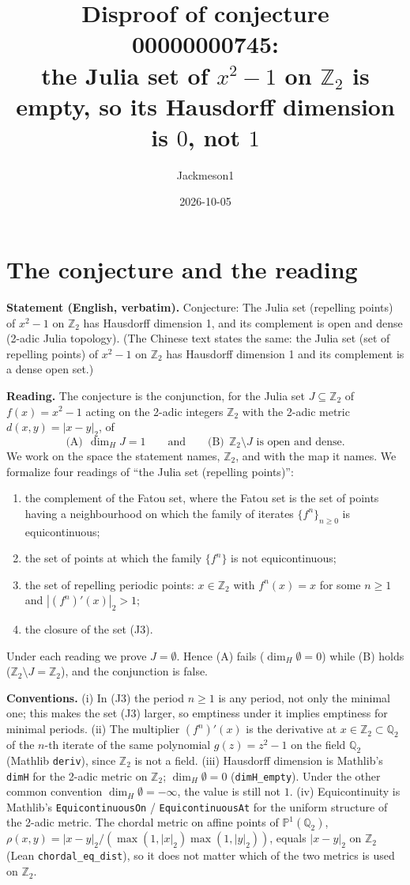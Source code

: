 \documentclass[11pt]{article}
\title{Disproof of conjecture 00000000745:\\ the Julia set of $x^2-1$ on $\mathbb{Z}_2$ is empty, so its Hausdorff dimension is $0$, not $1$}
\author{Jackmeson1}
\date{2026-10-05}
\theoremstyle{definition}
\newcommand{\Zt}{\mathbb{Z}_2}
\newcommand{\Qt}{\mathbb{Q}_2}
\begin{document}
\maketitle

\section{The conjecture and the reading}

\textbf{Statement (English, verbatim).} Conjecture: The Julia set (repelling points) of
$x^2 - 1$ on $\mathbb{Z}_2$ has Hausdorff dimension 1, and its complement is open and dense
(2-adic Julia topology). (The Chinese text states the same: the Julia set (set of repelling
points) of $x^2-1$ on $\mathbb{Z}_2$ has Hausdorff dimension 1 and its complement is a dense open
set.)

\textbf{Reading.} The conjecture is the conjunction, for the Julia set $J\subseteq\Zt$ of
$f(x)=x^2-1$ acting on the 2-adic integers $\Zt$ with the 2-adic metric
$d(x,y)=|x-y|_2$, of
\[
  \text{(A)}\ \ \dim_H J = 1 \qquad\text{and}\qquad \text{(B)}\ \ \Zt\setminus J \text{ is open and dense.}
\]
We work on the space the statement names, $\Zt$, and with the map it names. We formalize four
readings of ``the Julia set (repelling points)'':
\begin{enumerate}
\item[(J1)] the complement of the Fatou set, where the Fatou set is the set of points having a
  neighbourhood on which the family of iterates $\{f^{n}\}_{n\ge 0}$ is equicontinuous;
\item[(J2)] the set of points at which the family $\{f^{n}\}$ is not equicontinuous;
\item[(J3)] the set of repelling periodic points: $x\in\Zt$ with $f^{n}(x)=x$ for some $n\ge 1$
  and $|(f^{n})'(x)|_2>1$;
\item[(J4)] the closure of the set (J3).
\end{enumerate}
Under each reading we prove $J=\emptyset$. Hence (A) fails ($\dim_H\emptyset=0$) while (B) holds
($\Zt\setminus J=\Zt$), and the conjunction is false.

\textbf{Conventions.} (i) In (J3) the period $n\ge 1$ is any period, not only the minimal one; this
makes the set (J3) larger, so emptiness under it implies emptiness for minimal periods.
(ii) The multiplier $(f^{n})'(x)$ is the derivative at $x\in\Zt\subset\Qt$ of the $n$-th iterate
of the same polynomial $g(z)=z^2-1$ on the field $\Qt$ (Mathlib \texttt{deriv}), since $\Zt$
is not a field. (iii) Hausdorff dimension is Mathlib's \texttt{dimH} for the 2-adic metric on
$\Zt$; $\dim_H\emptyset=0$ (\texttt{dimH\_empty}). Under the other common convention
$\dim_H\emptyset=-\infty$, the value is still not $1$. (iv) Equicontinuity is Mathlib's
\texttt{EquicontinuousOn} / \texttt{EquicontinuousAt} for the uniform structure of the 2-adic
metric. The chordal metric on affine points of $\mathbb{P}^1(\Qt)$,
$\rho(x,y)=|x-y|_2/(\max(1,|x|_2)\max(1,|y|_2))$, equals $|x-y|_2$ on $\Zt$
(Lean \texttt{chordal\_eq\_dist}), so it does not matter which of the two metrics is used on $\Zt$.
\end{document}
